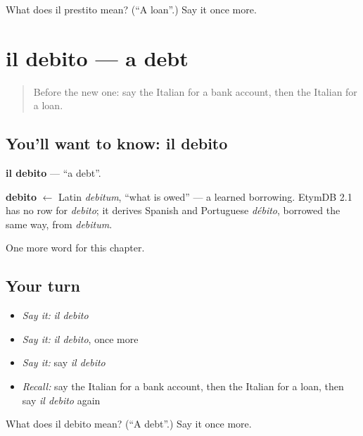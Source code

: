 \begin{tcolorbox}[breakable,colback=teal!4,colframe=teal!35!black,title={Before you move on}]
What does il prestito mean? (\textquotedblleft{}A loan\textquotedblright{}.) Say it once more.
\end{tcolorbox}
\section[il debito]{il debito — a debt}

\label{lesson:IT-C253-debito}



\begin{quote}
Before the new one: say the Italian for a bank account, then the Italian for a loan.
\end{quote}

\subsection*{You'll want to know: il debito}
\textbf{il debito} — \textquotedblleft{}a debt\textquotedblright{}.

\begin{cousinweb}
\textbf{debito} $\leftarrow$ Latin \emph{debitum}, \textquotedblleft{}what is owed\textquotedblright{} — a learned borrowing. EtymDB 2.1 has no row for \emph{debito}; it derives Spanish and Portuguese \emph{débito}, borrowed the same way, from \emph{debitum}.
\end{cousinweb}

\begin{grammarlens}[title={What you've built}]
One more word for this chapter.
\end{grammarlens}

\subsection*{Your turn}
\begin{itemize}
\raggedright
  \item \emph{Say it:} \emph{il debito}
  \item \emph{Say it:} \emph{il debito}, once more
  \item \emph{Say it:} say \emph{il debito}
  \item \emph{Recall:} say the Italian for a bank account, then the Italian for a loan, then say \emph{il debito} again
\end{itemize}

\begin{tcolorbox}[breakable,colback=teal!4,colframe=teal!35!black,title={Before you move on}]
What does il debito mean? (\textquotedblleft{}A debt\textquotedblright{}.) Say it once more.
\end{tcolorbox}
